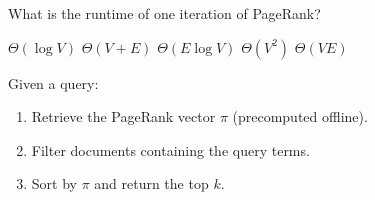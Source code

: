 \documentclass[11pt]{exam}
\begin{document}
\begin{Qu}
What is the runtime of one iteration of PageRank?
\begin{itemize}
    \aitem $\Theta(\log V)$
    \bitem $\Theta(V + E)$
    \citem $\Theta(E \log V)$
    \ditem $\Theta(V^2)$
		\eitem $\Theta(VE)$
\end{itemize}
\end{Qu}

\vspace{1em}


Given a query:
\begin{enumerate}
    \item Retrieve the PageRank vector $\pi$ (precomputed offline).
    \item Filter documents containing the query terms.
    \item Sort by $\pi$ and return the top $k$.
\end{enumerate}
\end{document}
